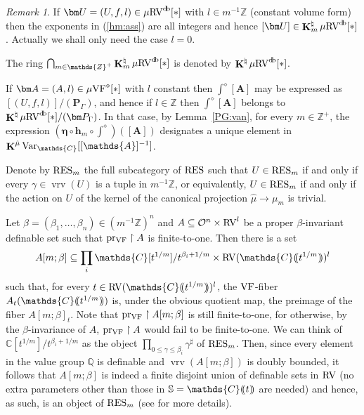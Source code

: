 \documentclass[12pt]{amsart}
\theoremstyle{plain}
\theoremstyle{definition}
\theoremstyle{remark}
\newtheorem{rem}[thm]{Remark}
\numberwithin{equation}{section}
\theoremstyle{plain}
\newcommand{\VF}{\textup{VF}}
\newcommand{\RV}{\textup{RV}}
\newcommand{\OO}{\mdl O}
\newcommand{\Z}{\mathds{Z}}
\newcommand{\A}{\mathds{A}}
\newcommand{\C}{\mathds{C}}
\newcommand{\Q}{\mathds{Q}}
\newcommand{\0}{\emptyset}
\newcommand{\dpar}[1]{%
   (\mkern-4mu (#1 )\mkern-4mu )}
\newcommand{\mdl}[1]{\mathcal{#1}}  %
\newcommand{\rest}{\upharpoonright}
\newcommand{\fun}{\longrightarrow}
\newcommand{\sub}{\subseteq}
\newcommand{\mgVF}{{\mu} {\VF}}
\newcommand{\mgRV}{{\mu}{\RV}}
\newcommand{\RES}{\textup{RES}}
\DeclareMathOperator{\ggk}{\mathbf{K}}
\DeclareMathOperator{\vrv}{vrv}
\DeclareMathOperator{\pvf}{pr_{\VF}}
\DeclareMathOperator{\db}{d \! b}
\newcommand{\var}{\textup{Var}}
\newcommand{\gmv}{\ggk^{\hat \mu}\var_{\C}}
\begin{document}
\begin{rem}\label{dia:to:db:dag}
If $\bm U = (U, f, l) \in \mgRV^{\db}[*]$ with $l \in m^{-1}\Z$ (constant volume form) then the exponents in (\ref{hm:ass}) are all integers and hence $[\bm U] \in \ggk^\natural_m \mgRV^{\db}[*]$. Actually we shall only need the case $l = 0$.

The ring $\bigcap_{m \in \Z^+} \ggk^\natural_m \mgRV^{\db}[*]$ is denoted by $\ggk^\natural \mgRV^{\db}[*]$.

If $\bm A = (A, l) \in \mgVF^\diamond[*]$ with $l$  constant then $\int^\diamond [\bm A]$ may be expressed as $[(U, f, l)]/ (\bm P_{\Gamma})$, and hence if $l \in \Z$ then $\int^\diamond [\bm A]$ belongs to $\ggk^\natural \mgRV^{\db}[*]/ (\bm P_{\Gamma})$. In that case, by Lemma~\ref{PG:van}, for every $m \in \Z^+$, the expression $(\bm \eta \circ \bm h_m \circ \int^\diamond)([\bm A])$ designates a unique element  in $\gmv[[\A]^{-1}]$.
\end{rem}


Denote by $\RES_{m}$ the full subcategory of $\RES$ such that $U \in \RES_{m}$ if and only if every $\gamma \in \vrv(U)$ is a tuple in $m^{-1} \Z$, or equivalently, $U \in \RES_{m}$ if and only if the action on $U$ of the kernel of the canonical projection $\hat \mu \fun \mu_m$ is trivial.


Let $\beta = (\beta_1, \ldots, \beta_n) \in (m^{-1} \Z)^n$ and $A \sub \OO^n \times \RV^l$ be a proper $\beta$-invariant definable set such that $\pvf \rest A$ is finite-to-one. Then there is a set
\[
A[m;\beta] \sub \prod_i \C[t^{1/m}] / t^{\beta_i + 1/m} \times \RV(\C \dpar{t^{1/m}})^l
\]
such that, for every $t \in \RV(\C \dpar{t^{1/m}})^l$, the $\VF$-fiber $A_t(\C \dpar{t^{1/m}})$ is, under the obvious quotient map, the preimage of the fiber $A[m;\beta]_t$. Note that $\pvf \rest A[m;\beta]$ is still finite-to-one, for otherwise, by the $\beta$-invariance of $A$, $\pvf \rest A$ would fail to be finite-to-one. We can think of $\C[t^{1/m}] / t^{\beta_i + 1/m}$ as the object $\prod_{0 \leq \gamma \leq \beta_i} \gamma^\sharp$ of $\RES_{m}$. Then, since every element in the value group $\Q$ is definable and $\vrv(A[m;\beta])$ is doubly bounded,  it follows that  $A[m;\beta]$ is indeed a finite disjoint union of definable sets in $\RV$ (no extra parameters other than those in $\mathbb{S} = \C \dpar{ t }$ are needed) and hence, as such, is an object of $\RES_{m}$ (see \cite[\S~4.2]{hru:loe:lef} for more details).
\end{document}
